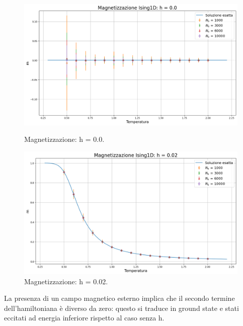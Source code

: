 \begin{figure}[htbp]
    \centering
    \begin{minipage}{0.5\textwidth}  
      \centering
      \includegraphics[page=1, width=\textwidth]{Immagini/simIsing1D/magn_h0.0.png}
      \caption{Magnetizzazione: h = 0.0.}
    \end{minipage}\hfill
    \begin{minipage}{0.5\textwidth}  
      \centering
      \includegraphics[page=1, width=\textwidth]{Immagini/simIsing1D/magn_h0.02.png}
      \caption{Magnetizzazione: h = 0.02.}
    \end{minipage}
\end{figure}

La presenza di un campo magnetico esterno implica che il secondo termine dell'hamiltoniana è diverso da zero: questo si traduce in 
ground state e stati eccitati ad energia inferiore rispetto al caso senza h.

